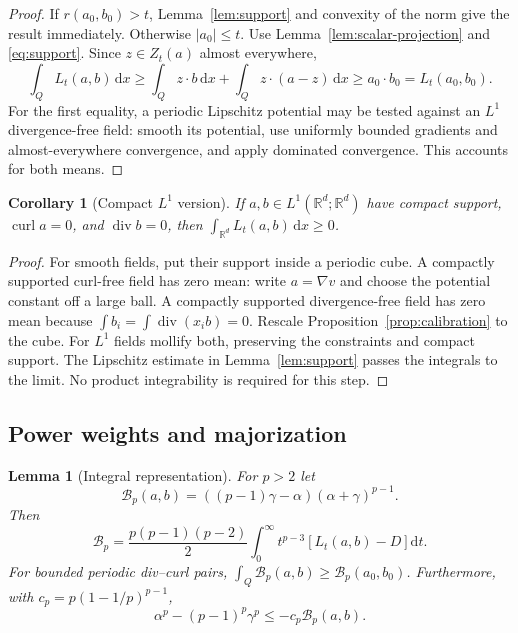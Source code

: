 \documentclass[11pt,a4paper]{article}
\numberwithin{equation}{section}
\newtheorem{lemma}[theorem]{Lemma}
\newtheorem{corollary}[theorem]{Corollary}
\theoremstyle{definition}
\theoremstyle{remark}\newtheorem{remark}[theorem]{Remark}
\DeclareMathOperator{\diver}{div}
\DeclareMathOperator{\curl}{curl}
\newcommand{\R}{\mathbb R}
\newcommand{\dd}{\,\mathrm dx}
\begin{document}
\begin{proof}
If \(r(a_0,b_0)>t\), Lemma~\ref{lem:support} and convexity of the norm
give the result immediately. Otherwise \(|a_0|\leq t\).
Use Lemma~\ref{lem:scalar-projection} and \eqref{eq:support}. Since
\(z\in Z_t(a)\) almost everywhere,
\[
 \int_QL_t(a,b)\dd
 \geq\int_Q z\cdot b\dd+\int_Qz\cdot(a-z)\dd
 \geq a_0\cdot b_0=L_t(a_0,b_0).
\]
For the first equality, a periodic Lipschitz potential may be tested
against an \(L^1\) divergence-free field: smooth its potential,
use uniformly bounded gradients and almost-everywhere convergence,
and apply dominated convergence. This accounts for both means.
\end{proof}

\begin{corollary}[Compact \(L^1\) version]\label{cor:compact-calibration}
If \(a,b\in L^1(\R^d;\R^d)\) have compact support,
\(\curl a=0\), and \(\diver b=0\), then
\(\int_{\R^d}L_t(a,b)\dd\geq0\).
\end{corollary}

\begin{proof}
For smooth fields, put their support inside a periodic cube.
A compactly supported curl-free field has zero mean:
write \(a=\nabla v\) and choose the potential constant off a large ball.
A compactly supported divergence-free field has zero mean because
\(\int b_i=\int\diver(x_i b)=0\).
Rescale Proposition~\ref{prop:calibration} to the cube.
For \(L^1\) fields mollify both, preserving the constraints and compact
support. The Lipschitz estimate in Lemma~\ref{lem:support} passes the
integrals to the limit. No product integrability is required for this step.
\end{proof}

\subsection{Power weights and majorization}

\begin{lemma}[Integral representation]\label{lem:burkholder}
For \(p>2\) let
\[
 \mathcal B_p(a,b)=((p-1)\gamma-\alpha)(\alpha+\gamma)^{p-1}.
\]
Then
\begin{equation}\label{eq:burkholder-rep}
 \mathcal B_p=
 \frac{p(p-1)(p-2)}2
       \int_0^\infty t^{p-3}[L_t(a,b)-D]\mathrm dt.
\end{equation}
For bounded periodic div--curl pairs,
\(\int_Q\mathcal B_p(a,b)\geq\mathcal B_p(a_0,b_0)\).
Furthermore, with \(c_p=p(1-1/p)^{p-1}\),
\begin{equation}\label{eq:majorization}
 \alpha^p-(p-1)^p\gamma^p\leq-c_p\mathcal B_p(a,b).
\end{equation}
\end{lemma}
\end{document}
